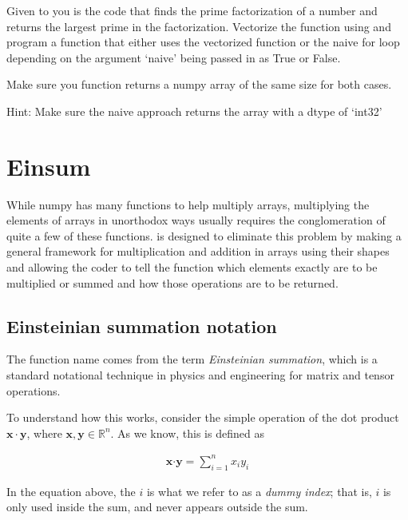 \begin{problem}

Given to you is the code that finds the prime factorization of a number and returns the largest prime in the factorization.
Vectorize the function using  and program a function that either uses the vectorized function or the naive for loop depending on the argument `naive' being passed in as True or False.

Make sure you function returns a numpy array of the same size for both cases.

\noindent Hint: Make sure the naive approach returns the array with a dtype of `int32'

\end{problem}

\section*{Einsum}

While numpy has many functions to help multiply arrays, multiplying the elements of arrays in unorthodox ways usually requires the conglomeration of quite a few of these functions.
 is designed to eliminate this problem by making a general framework for multiplication and addition in arrays using their shapes and allowing the coder to tell the function which elements exactly are to be multiplied or summed and how those operations are to be returned.

\subsection*{Einsteinian summation notation}
The function name  comes from the term \emph{Einsteinian summation}, which is a standard notational technique in physics and engineering for matrix and tensor operations.

To understand how this works, consider the simple operation of the dot product $\mathbf{x} \cdot \mathbf{y}$, where $\mathbf{x}, \mathbf{y} \in \mathbb{R}^n$.
As we know, this is defined as

\begin{align*}
\mathbf{x} \boldsymbol{\cdot} \mathbf{y} = \sum_{i=1}^{n} x_i y_i
\end{align*}

In the equation above, the $i$ is what we refer to as a \emph{dummy index}; that is, $i$ is only used inside the sum, and never appears outside the sum.

